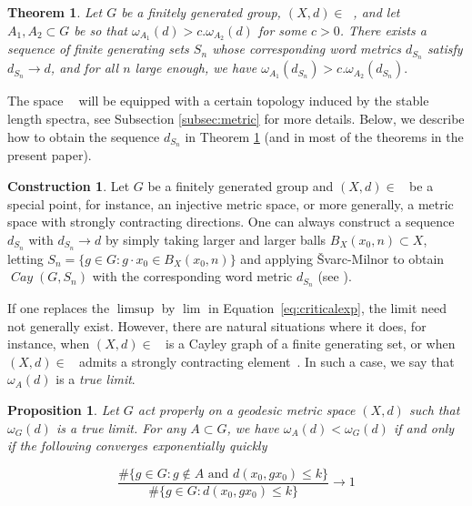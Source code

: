 \documentclass{amsart}
\newtheorem{mainthm}{Theorem}
\numberwithin{thm}{section}
\numberwithin{figure}{section}
\newtheorem{prop}[thm]{Proposition}
\theoremstyle{definition}
\newtheorem{construction}[thm]{Construction}
\theoremstyle{definition}
\theoremstyle{remark}
\numberwithin{equation}{section}
\DeclareMathOperator{\Cay}{\mathit{Cay}}
\DeclareMathOperator{\DDG}{\mathcal{D}(G)}
\theoremstyle{plain}
\begin{document}
\begin{mainthm}\label{thm:Most_main_theorem} Let $G$ be a finitely generated group, $(X,d) \in \DDG$, and let $A_1,A_2 \subset G$ be so that $\omega_{A_1}(d)>c.\omega_{A_2}(d)$ for some $c>0$. There exists a sequence of finite generating sets $S_n$ whose corresponding word metrics $d_{S_n}$ satisfy $d_{S_n} \rightarrow d$, and for all $n$ large enough, we have
$\omega_{A_1}(d_{S_n})>c.\omega_{A_2}(d_{S_n}).$
\label{thm:main}
\end{mainthm}
 The space $\DDG$ will be equipped with a certain topology induced by  the stable length spectra, see Subsection \ref{subsec:metric} for more details. Below, we describe how to obtain the sequence $d_{S_n}$ in Theorem \ref{thm:Most_main_theorem} (and in most of the theorems in the present paper).

\begin{construction} Let $G$ be a finitely generated group and $(X,d) \in \DDG$ be a special point, for instance, an injective metric space, or more generally, a metric space with strongly contracting directions. One can always construct a sequence $d_{S_n}$ with $d_{S_n} \rightarrow d$ by simply taking larger and larger balls $B_X(x_0,n) \subset X$, letting $S_n=\{g \in G: g \cdot x_0 \in B_X(x_0,n)\}$ and applying Švarc-Milnor to obtain $\Cay(G,S_n)$ with the corresponding word metric $d_{S_n}$ (see \cite[Lemma~4.2.12]{Reyes23:Thesis}).
\label{cons:generatingsets}
\end{construction}




If one replaces the $\limsup$ by $\lim$ in Equation~\ref{eq:criticalexp}, the limit need not generally exist. However, there are natural situations where it does, for instance, when $(X,d) \in \DDG$ is a Cayley graph of a finite generating set, or when $(X,d) \in \DDG$ admits a strongly contracting element~\cite{Yang17:ConvexCocompact}. In such a case, we say that $\omega_A(d)$ is a \emph{true limit}. 

\begin{prop}\label{prop:rate_to_density} Let $G$ act properly on a geodesic metric space $(X,d)$ such that $\omega_G(d)$ is a true limit. For any $A \subset G$, we have $\omega_A(d)<\omega_G(d)$ if and only if the following converges exponentially quickly

\[ \frac{\#\{g \in G: g \notin A \text{ and }d(x_0,gx_0) \leq k\}}{\# \{g \in G: d(x_0,gx_0) \leq k\}} \rightarrow 1\] 
\label{prop:gapimpliesexpgenericity}
\end{prop}
\end{document}
